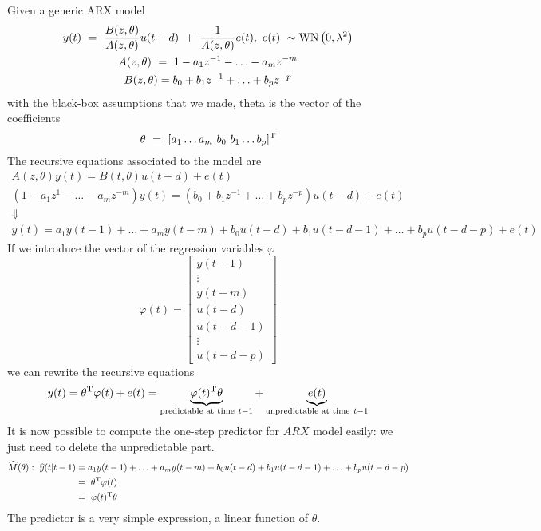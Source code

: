 Given a generic ARX model
\begin{gather*}
y( t) \ =\ \frac{B( z,\theta )}{A( z,\theta )} u( t-d) \ +\ \frac{1}{A( z,\theta )} e( t) ,\ e( t) \ \sim \operatorname{WN}\left( 0,\lambda ^{2}\right)\\
A( z,\theta ) \ =\ 1-a_{1} z^{-1} -\dotsc -a_{m} z^{-m}\\
B( z,\theta ) =b_{0} +b_{1} z^{-1} +\dotsc +b_{p} z^{-p}
\end{gather*}
with the black-box assumptions that we made, theta is the vector of the coefficients
\begin{equation*}
\theta \ =\ [ a_{1} \dotsc a_{m} \ b_{0} \ b_{1} \dotsc b_{p}]^{\mathrm{T}}
\end{equation*}
The recursive equations associated to the model are
\begin{gather*}
A( z,\theta ) y( t) =B( t,\theta ) u( t-d) +e( t)\\
\left( 1-a_{1} z^{1} -\dotsc -a_{m} z^{-m}\right) y( t) =\left( b_{0} +b_{1} z^{-1} +\dotsc +b_{p} z^{-p}\right) u( t-d) +e( t)\\
\Downarrow \\
y( t) =a_{1} y( t-1) +\dotsc +a_{m} y( t-m) +b_{0} u( t-d) +b_{1} u( t-d-1) +\dotsc +b_{p} u( t-d-p) +e( t)
\end{gather*}
If we introduce the vector of the regression variables $ \varphi $
\begin{equation*}
\varphi ( t) =\begin{bmatrix}
y( t-1)\\
\vdots \\
y( t-m)\\
u( t-d)\\
u( t-d-1)\\
\vdots \\
u( t-d-p)
\end{bmatrix}
\end{equation*}
we can rewrite the recursive equations
\begin{equation*}
y( t) =\theta ^{\mathrm{T}} \varphi ( t) +e( t) =\underbrace{\varphi ( t)^{\mathrm{T}} \theta }_{\text{predictable at time} \ t-1} +\underbrace{e( t)}_{\text{unpredictable at time} \ t-1}
\end{equation*}
It is now possible to compute the one-step predictor for $ ARX$ model easily: we just need to delete the unpredictable part.
\begin{align*}
\widehat{M}( \theta ) :\ \widehat{y}( t|t-1) & =a_{1} y( t-1) +\dotsc +a_{m} y( t-m) +b_{0} u( t-d) +b_{1} u( t-d-1) +\dotsc +b_{p} u( t-d-p)\\
 & =\ \theta ^{\mathrm{T}} \varphi ( t) \ \\
 & =\ \varphi ( t)^{\mathrm{T}} \theta 
\end{align*}
The predictor is a very simple expression, a linear function of $ \theta $.

